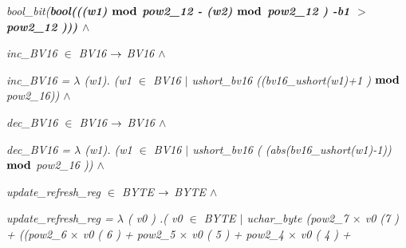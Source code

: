 \documentclass[11pt]{article}
\begin{document}
\begin{sloppypar}
\hspace*{0.40in}\it bool\_bit\rm (\bf bool\rm (\rm (\hspace*{0.10in}\rm (\it w1\rm )  $\mod$  \it pow2\_12 \rm - \rm (\it w2\rm )  $\mod$  \it pow2\_12 \rm ) \rm -\it b1 $>$\hspace*{0.10in}\it pow2\_12 \rm )\rm )\hspace*{0.10in}\rm )  $\land$ 

\hspace*{0.20in}

\hspace*{0.20in}

\hspace*{0.20in}\it inc\_BV16  $\in$ \hspace*{0.10in}\it BV16\hspace*{0.10in} $\fun$  \it BV16  $\land$ 

\hspace*{0.20in}\it inc\_BV16 \rm =  $\lambda$  \rm (\it w1\rm )\rm . \rm (\it w1  $\in$  \it BV16  $\mid$  \it ushort\_bv16 \rm (\rm (\it bv16\_ushort\rm (\it w1\rm )\rm +\rm 1 \rm )  $\mod$  \it pow2\_16\rm )\hspace*{0.10in}\rm )  $\land$ 

\hspace*{0.20in}

\hspace*{0.20in}\it dec\_BV16  $\in$ \hspace*{0.10in}\it BV16\hspace*{0.10in} $\fun$  \it BV16  $\land$ 

\hspace*{0.20in}\it dec\_BV16 \rm =  $\lambda$  \rm (\it w1\rm )\rm . \rm (\it w1  $\in$  \it BV16  $\mid$  \it ushort\_bv16 \rm ( \rm (\it abs\rm (\it bv16\_ushort\rm (\it w1\rm )\rm -\rm 1\rm )\rm )\hspace*{0.10in} $\mod$  \it pow2\_16 \rm )\hspace*{0.10in}\rm )  $\land$ 

\hspace*{0.20in}

\hspace*{0.20in}

\hspace*{0.20in}\it update\_refresh\_reg\hspace*{0.15in} $\in$  \it BYTE  $\fun$  \it BYTE  $\land$ 

\hspace*{0.20in}\it update\_refresh\_reg \rm =\hspace*{0.10in} $\lambda$  \rm ( \it v0 \rm ) \rm .\hspace*{0.10in}\rm ( \it v0  $\in$  \it BYTE  $\mid$  \it uchar\_byte \rm (\it pow2\_7 $\times$ \it v0 \rm (\rm 7 \rm ) \rm + \rm (\rm (\hspace*{0.10in}\it pow2\_6  $\times$  \it v0 \rm ( \rm 6 \rm ) \rm + \it pow2\_5  $\times$  \it v0 \rm ( \rm 5 \rm ) \rm + \it pow2\_4  $\times$  \it v0 \rm ( \rm 4 \rm ) \rm +


\end{sloppypar}
\end{document}
